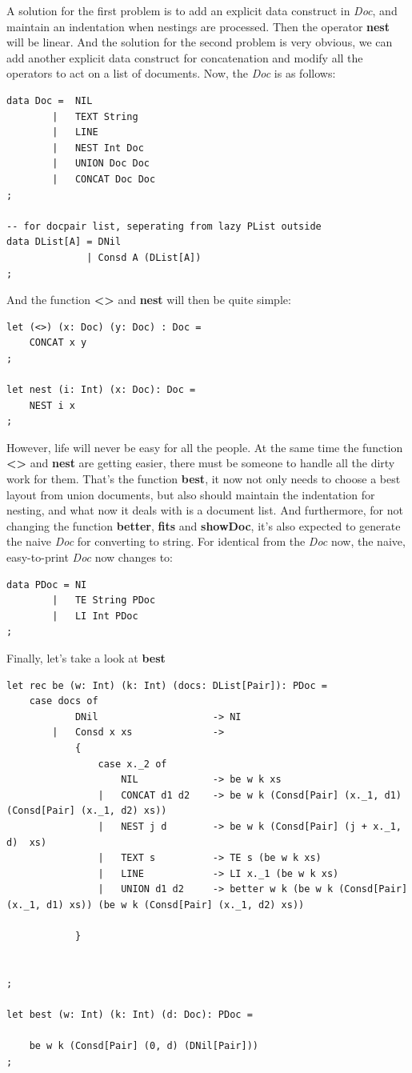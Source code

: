 A solution for the first problem is to add an explicit data construct in \textit{Doc}, and maintain an indentation when nestings are processed. Then the operator \textbf{nest} will be linear. And the solution for the second problem is very obvious, we can add another explicit data construct for concatenation and modify all
the operators to act on a list of documents. Now, the \textit{Doc} is as follows:
\begin{lstlisting}
data Doc =  NIL
        |   TEXT String
        |   LINE
        |   NEST Int Doc
        |   UNION Doc Doc
        |   CONCAT Doc Doc
;

-- for docpair list, seperating from lazy PList outside
data DList[A] = DNil
              | Consd A (DList[A])
;
\end{lstlisting}
And the function \textbf{<>} and \textbf{nest} will then be quite simple:
\begin{lstlisting}
let (<>) (x: Doc) (y: Doc) : Doc =
    CONCAT x y
;

let nest (i: Int) (x: Doc): Doc =
    NEST i x
;
\end{lstlisting}
However, life will never be easy for all the people. At the same time the function \textbf{<>} and \textbf{nest} are getting easier, there must be someone to handle all the dirty work for them. That's the function \textbf{best}, it now not only needs to choose a best layout from union documents, but also should maintain the indentation for nesting, and what now it deals with is a document list. And furthermore, for not changing the function \textbf{better}, \textbf{fits} and \textbf{showDoc}, it's also expected to generate the naive \textit{Doc} for converting to string. For identical from the \textit{Doc} now, the naive, easy-to-print \textit{Doc} now changes to:
\begin{lstlisting}
data PDoc = NI
        |   TE String PDoc
        |   LI Int PDoc
;
\end{lstlisting}
Finally, let's take a look at \textbf{best}


\begin{lstlisting}
let rec be (w: Int) (k: Int) (docs: DList[Pair]): PDoc =
    case docs of
            DNil                    -> NI
        |   Consd x xs              ->
            {
                case x._2 of
                    NIL             -> be w k xs
                |   CONCAT d1 d2    -> be w k (Consd[Pair] (x._1, d1) (Consd[Pair] (x._1, d2) xs))
                |   NEST j d        -> be w k (Consd[Pair] (j + x._1, d)  xs)
                |   TEXT s          -> TE s (be w k xs)
                |   LINE            -> LI x._1 (be w k xs)
                |   UNION d1 d2     -> better w k (be w k (Consd[Pair] (x._1, d1) xs)) (be w k (Consd[Pair] (x._1, d2) xs))

            }


;

let best (w: Int) (k: Int) (d: Doc): PDoc =

    be w k (Consd[Pair] (0, d) (DNil[Pair]))
;
\end{lstlisting}

